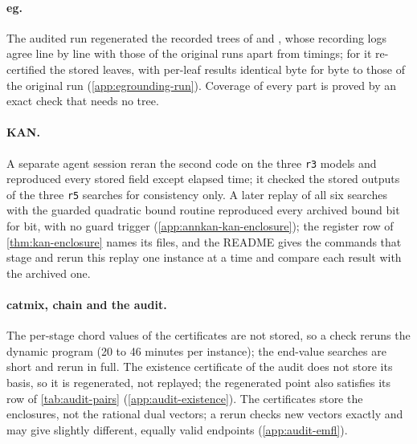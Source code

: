 \paragraph{eg.}
The audited run regenerated the recorded trees of  and , whose recording logs agree line by line with those of the original runs apart from timings; for  it re-certified the stored leaves, with per-leaf results identical byte for byte to those of the original run (\cref{app:egrounding-run}).
Coverage of every part is proved by an exact check that needs no tree.

\paragraph{KAN.}
A separate agent session reran the second code on the three \texttt{r3} models and reproduced every stored field except elapsed time; it checked the stored outputs of the three \texttt{r5} searches for consistency only.
A later replay of all six searches with the guarded quadratic bound routine reproduced every archived bound bit for bit, with no guard trigger (\cref{app:annkan-kan-enclosure}); the register row of \cref{thm:kan-enclosure} names its files, and the README gives the commands that stage and rerun this replay one instance at a time and compare each result with the archived one.

\paragraph{catmix, chain and the audit.}
The per-stage chord values of the  certificates are not stored, so a check reruns the dynamic program (20 to 46 minutes per instance); the  end-value searches are short and rerun in full.
The  existence certificate of the audit does not store its basis, so it is regenerated, not replayed; the regenerated point also satisfies its row of \cref{tab:audit-pairs} (\cref{app:audit-existence}).
The  certificates store the enclosures, not the rational dual vectors; a rerun checks new vectors exactly and may give slightly different, equally valid endpoints (\cref{app:audit-emfl}).
